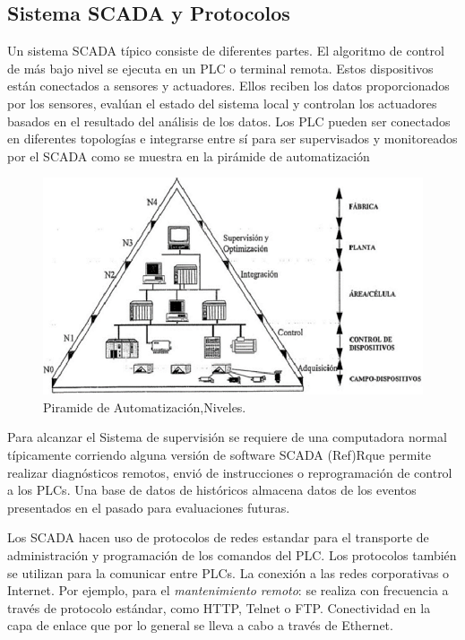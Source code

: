 \documentclass[jou]{apa6}   %
\begin{document}
\subsection{Sistema SCADA y Protocolos }
Un sistema SCADA típico consiste de diferentes partes. El algoritmo de control de más bajo nivel se ejecuta en un PLC o terminal remota. Estos dispositivos están conectados a sensores y actuadores. Ellos reciben los datos proporcionados por los sensores, evalúan el estado del sistema local  y controlan los actuadores basados en el resultado del análisis de los datos. Los PLC pueden ser conectados en diferentes topologías e integrarse entre sí para ser supervisados y monitoreados por el SCADA como se muestra en la pirámide de automatización 
\begin{figure}[htb]
\centering
\includegraphics[scale=0.4]{images/piramide.png}
\caption{Piramide de Automatización,Niveles.} \label{fig:piramide}
\end{figure}
Para alcanzar el Sistema de supervisión se requiere de una computadora normal típicamente corriendo alguna versión de software SCADA (Ref)Rque permite realizar diagnósticos remotos, envió de instrucciones o reprogramación de control a los PLCs. Una base de datos de históricos almacena datos de los eventos presentados  en el pasado para evaluaciones futuras\cite{TrendMicro}. 

Los SCADA hacen uso de protocolos de redes estandar para el transporte de administración y  programación de los comandos del PLC. Los protocolos también se utilizan para la comunicar entre PLCs. La conexión a las redes corporativas o Internet. Por ejemplo, para el \textit{mantenimiento remoto}: se realiza con frecuencia a través de protocolo estándar, como HTTP, Telnet o FTP. Conectividad en la capa de enlace que por lo general se lleva a cabo a través de Ethernet.
\end{document}
